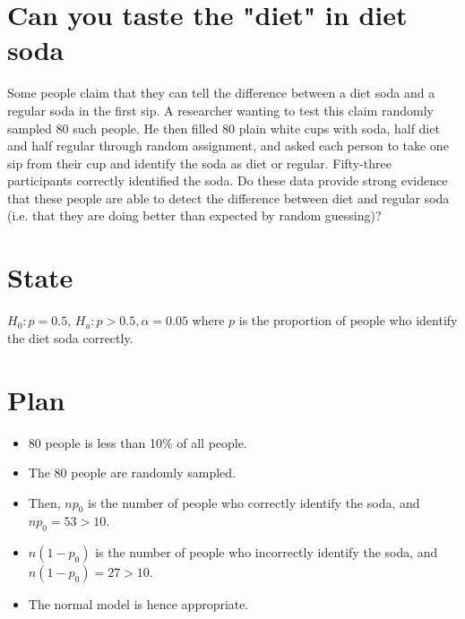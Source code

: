 \documentclass{scrreprt} %
\begin{document}
\section{Can you taste the "diet" in diet soda}

Some people claim that they can tell the difference between a diet soda and a regular soda in the
first sip. A researcher wanting to test this claim randomly sampled 80 such people. He then filled
80 plain white cups with soda, half diet and half regular through random assignment, and asked
each person to take one sip from their cup and identify the soda as diet or regular. Fifty-three
participants correctly identified the soda. Do these data provide strong evidence that these people
are able to detect the difference between diet and regular soda (i.e. that they are doing better
than expected by random guessing)?

\newpage

\section{State}


$H_0: p = 0.5$, $H_a: p > 0.5, \alpha = 0.05$
where $p$ is the proportion of people who identify the diet soda correctly.

\newpage

\section{Plan}

\begin{itemize}
	\item 80 people is less than 10\% of all people.
	\item The 80 people are randomly sampled.
	\item Then, $np_0$ is the number of people who correctly identify
	the soda, and $np_0 = 53 > 10$.
	\item $n(1-p_0)$ is the number of people who incorrectly identify the
	soda, and $n(1-p_0)= 27 > 10$.
	\item The normal model is hence appropriate.
\end{itemize}

\newpage
\end{document}
